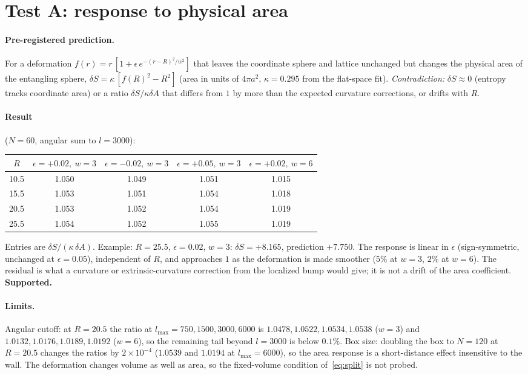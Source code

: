 \documentclass[11pt]{article}
\begin{document}
\section{Test A: response to physical area}
\paragraph{Pre-registered prediction.} For a deformation $f(r)=r\,[1+\epsilon\, e^{-(r-R)^2/w^2}]$ that leaves the coordinate sphere and lattice unchanged but changes the physical area of the entangling sphere, $\delta S=\kappa\,[f(R)^2-R^2]$ (area in units of $4\pi a^2$, $\kappa=0.295$ from the flat-space fit). \emph{Contradiction:} $\delta S\approx0$ (entropy tracks coordinate area) or a ratio $\delta S/\kappa\delta A$ that differs from $1$ by more than the expected curvature corrections, or drifts with $R$.

\paragraph{Result} ($N=60$, angular sum to $l=3000$):
\begin{center}\small
\begin{tabular}{ccccc}\toprule
$R$ & $\epsilon=+0.02,\ w=3$ & $\epsilon=-0.02,\ w=3$ & $\epsilon=+0.05,\ w=3$ & $\epsilon=+0.02,\ w=6$\\\midrule
10.5 & 1.050 & 1.049 & 1.051 & 1.015\\
15.5 & 1.053 & 1.051 & 1.054 & 1.018\\
20.5 & 1.053 & 1.052 & 1.054 & 1.019\\
25.5 & 1.054 & 1.052 & 1.055 & 1.019\\\bottomrule
\end{tabular}
\end{center}
Entries are $\delta S/(\kappa\,\delta A)$. Example: $R=25.5$, $\epsilon=0.02$, $w=3$: $\delta S=+8.165$, prediction $+7.750$. The response is linear in $\epsilon$ (sign-symmetric, unchanged at $\epsilon=0.05$), independent of $R$, and approaches $1$ as the deformation is made smoother ($5\%$ at $w=3$, $2\%$ at $w=6$). The residual is what a curvature or extrinsic-curvature correction from the localized bump would give; it is not a drift of the area coefficient. \textbf{Supported.}

\paragraph{Limits.} Angular cutoff: at $R=20.5$ the ratio at $l_{\max}=750,1500,3000,6000$ is $1.0478,1.0522,1.0534,1.0538$ ($w=3$) and $1.0132,1.0176,1.0189,1.0192$ ($w=6$), so the remaining tail beyond $l=3000$ is below $0.1\%$. Box size: doubling the box to $N=120$ at $R=20.5$ changes the ratios by $2\times10^{-4}$ ($1.0539$ and $1.0194$ at $l_{\max}=6000$), so the area response is a short-distance effect insensitive to the wall. The deformation changes volume as well as area, so the fixed-volume condition of~\eqref{eq:split} is not probed.
\end{document}
